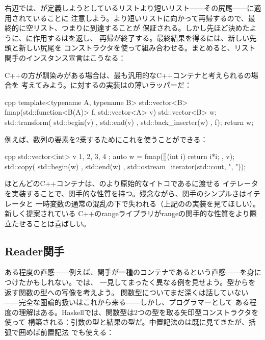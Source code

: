 右辺では、が定義しようとしているリストより短いリスト――その尻尾――に適用されていることに
注意しよう。より短いリストに向かって再帰するので、最終的に空リスト、つまりに到達することが
保証される。しかし先ほど決めたように、に作用するはを返し、
再帰が終了する。最終結果を得るには、新しい先頭と新しい尻尾を
コンストラクタを使って組み合わせる。まとめると、リスト関手のインスタンス宣言はこうなる：

C++の方が馴染みがある場合は、最も汎用的なC++コンテナと考えられるの場合を
考えてみよう。に対するの実装はの薄いラッパーだ：

\begin{snip}{cpp}
template<typename A, typename B>
std::vector<B> fmap(std::function<B(A)> f, std::vector<A> v) {
    std::vector<B> w;
    std::transform( std::begin(v)
                  , std::end(v)
                  , std::back_inserter(w)
                  , f);
    return w;
}
\end{snip}
例えば、数列の要素を2乗するためにこれを使うことができる：

\begin{snip}{cpp}
std::vector<int> v{ 1, 2, 3, 4 };
auto w = fmap([](int i) { return i*i; }, v);
std::copy( std::begin(w)
         , std::end(w)
         , std::ostream_iterator(std::cout, ", "));
\end{snip}
ほとんどのC++コンテナは、のより原始的なイトコであるに渡せる
イテレータを実装することで、関手的な性質を持つ。残念ながら、関手のシンプルさはイテレータと
一時変数の通常の混乱の下で失われる（上記のの実装を見てほしい）。新しく提案されている
C++のrangeライブラリがrangeの関手的な性質をより際立たせることは喜ばしい。

\subsection{Reader関手}

ある程度の直感――例えば、関手が一種のコンテナであるという直感――を身につけたかもしれない。では、
一見してまったく異なる例を見せよう。型からを返す関数の型への写像を考えよう。
関数型についてまだ深くは話していない――完全な圏論的扱いはこれから来る――しかし、プログラマーとして
ある程度の理解はある。Haskellでは、関数型は2つの型を取る矢印型コンストラクタ\code{(->)}を使って
構築される：引数の型と結果の型だ。中置記法のは既に見てきたが、括弧で囲めば前置記法
でも使える：

